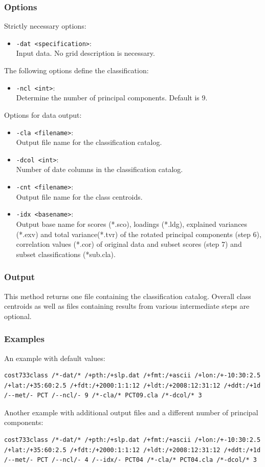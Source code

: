 \documentclass[12pt, oneside, a4paper, headsepline, plainheadsepline]{scrbook}
\begin{document}
\subsubsection*{Options}
Strictly necessary options:
\begin{itemize}
 \item \verb+-dat <specification>+:\\ Input data. No grid description is necessary.
\end{itemize}
The following options define the classification:
\begin{itemize}
 \item \verb+-ncl <int>+:\\ Determine the number of principal components. Default is 9.
\end{itemize}
Options for data output:
\begin{itemize}
 \item \verb+-cla <filename>+:\\ Output file name for the classification catalog.
 \item \verb+-dcol <int>+:\\ Number of date columns in the classification catalog.
 \item \verb+-cnt <filename>+:\\ Output file name for the class centroids.
 \item \verb+-idx <basename>+:\\ Output base name for scores (*.sco), loadings (*.ldg), explained variances (*.exv) and total variance(*.tvr) of the rotated principal components (step 6), correlation values (*.cor) of original data and subset scores (step 7) and subset classifications (*sub.cla).
\end{itemize}

\subsubsection*{Output}
This method returns one file containing the classification catalog. 
Overall class centroids as well as files containing results from various intermediate steps are optional.

\subsubsection*{Examples}
An example with default values:
\begin{lstlisting}
cost733class /*-dat/* /+pth:/+slp.dat /+fmt:/+ascii /+lon:/+-10:30:2.5 /+lat:/+35:60:2.5 /+fdt:/+2000:1:1:12 /+ldt:/+2008:12:31:12 /+ddt:/+1d /--met/- PCT /--ncl/- 9 /*-cla/* PCT09.cla /*-dcol/* 3 
\end{lstlisting}
Another example with additional output files and a different number of principal components:
\begin{lstlisting}
cost733class /*-dat/* /+pth:/+slp.dat /+fmt:/+ascii /+lon:/+-10:30:2.5 /+lat:/+35:60:2.5 /+fdt:/+2000:1:1:12 /+ldt:/+2008:12:31:12 /+ddt:/+1d /--met/- PCT /--ncl/- 4 /--idx/- PCT04 /*-cla/* PCT04.cla /*-dcol/* 3 
\end{lstlisting}
\end{document}
